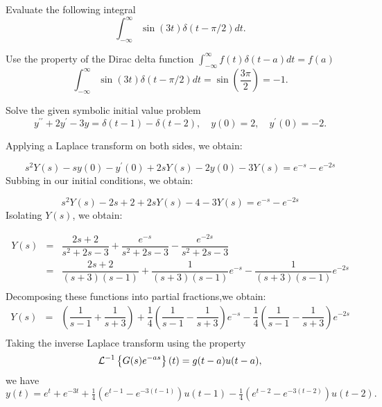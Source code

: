 \documentclass[11pt]{article}
\begin{document}
\begin{problem}
Evaluate the following integral
\begin{equation*}
\int_{-\infty}^{\infty} \sin(3t)\delta(t-\pi/2) d t.
\end{equation*}
\end{problem}
\begin{solution} 
Use the property of the Dirac delta function $\int_{-\infty}^{\infty} f(t) \delta(t-a) d t = f(a)$
\begin{equation*}
\int_{-\infty}^{\infty} \sin(3t)\delta(t-\pi/2) d t = \sin\left(\dfrac{3 \pi}{2} \right) =-1.
\end{equation*}
\end{solution}




\begin{problem}
Solve the given symbolic initial value problem
\begin{equation*}
y^{\prime \prime} + 2 y^{\prime} - 3 y = \delta(t-1) - \delta(t-2) , \quad y(0) =2 , \quad y^{\prime}(0) = -2.
\end{equation*}
\end{problem}
\begin{solution}
Applying a Laplace transform on both sides, we obtain:

\begin{equation*}
s^2 Y(s) -sy(0) - y^{\prime}(0) + 2sY(s) - 2y(0) - 3 Y(s) = e^{-s} - e^{-2s}
\end{equation*}
Subbing in our initial conditions, we obtain:

\begin{equation*}
s^2 Y(s) -2s +2 + 2sY(s) - 4 - 3 Y(s) = e^{-s} - e^{-2s}
\end{equation*}
Isolating $Y(s)$, we obtain:

\begin{eqnarray*}
Y(s) & = & \dfrac{2s+2}{s^2+2s-3}+ \dfrac{e^{-s}}{s^2+2s-3} - \dfrac{e^{-2s}}{s^2+2s-3}  \\
& = & \dfrac{2s+2}{(s+3)(s-1)}+\dfrac{1}{(s+3)(s-1)}e^{-s} - \dfrac{1}{(s+3)(s-1)}e^{-2s}  \\
\end{eqnarray*}
Decomposing these functions into partial fractions,we obtain:
\begin{eqnarray*}
Y(s) & = & \left( \dfrac{1}{s-1} + \dfrac{1}{s+3} \right)+ \dfrac{1}{4}\left( \dfrac{1}{s-1} - \dfrac{1}{s+3} \right) e^{-s}  -\dfrac{1}{4} \left( \dfrac{1}{s-1} - \dfrac{1}{s+3} \right) e^{-2s} \\
\end{eqnarray*}
Taking the inverse Laplace transform using the property $${\cal L}^{-1} \left\{ G(s)e^{-as} \right\}(t) = g(t-a)u(t-a),$$ we have
\begin{equation*}
\boxed{y(t) = e^{t}+e^{-3t}   + \tfrac{1}{4} \left( e^{t-1}-e^{-3(t-1)} \right)u(t-1) - \tfrac{1}{4} \left( e^{t-2}-e^{-3(t-2)} \right)u(t-2)}.
\end{equation*}
\end{solution}
\end{document}

